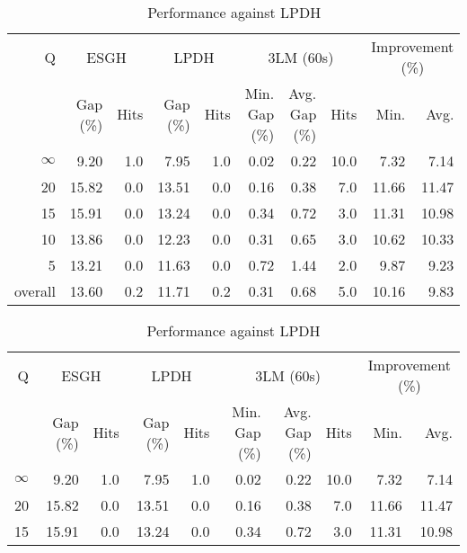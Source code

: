 \begin{table}[H]
\centering
\caption{Performance against LPDH}
\label{tab:3lm_resuts_kritikos2}
\begin{tabular}{r rr rr rrr rr}
\toprule
       Q & \multicolumn{2}{c}{ESGH} & \multicolumn{2}{c}{LPDH} & \multicolumn{3}{c}{3LM (60s)} & \multicolumn{2}{c}{Improvement (\%)} \\
         & Gap (\%) & Hits & Gap (\%) & Hits & Min. Gap (\%) & Avg. Gap (\%) & Hits &             Min. &  Avg. \\
\midrule
$\infty$ &     9.20 &  1.0 &     7.95 &  1.0 &          0.02 &          0.22 & 10.0 &             7.32 &  7.14 \\
      20 &    15.82 &  0.0 &    13.51 &  0.0 &          0.16 &          0.38 &  7.0 &            11.66 & 11.47 \\
      15 &    15.91 &  0.0 &    13.24 &  0.0 &          0.34 &          0.72 &  3.0 &            11.31 & 10.98 \\
      10 &    13.86 &  0.0 &    12.23 &  0.0 &          0.31 &          0.65 &  3.0 &            10.62 & 10.33 \\
       5 &    13.21 &  0.0 &    11.63 &  0.0 &          0.72 &          1.44 &  2.0 &             9.87 &  9.23 \\
\midrule
 overall &    13.60 &  0.2 &    11.71 &  0.2 &          0.31 &          0.68 &  5.0 &            10.16 &  9.83 \\
\bottomrule
\end{tabular}
\end{table}\begin{table}[H]
\centering
\caption{Performance against LPDH}
\label{tab:3lm_resuts_kritikos2}
\begin{tabular}{r rr rr rrr rr}
\toprule
       Q & \multicolumn{2}{c}{ESGH} & \multicolumn{2}{c}{LPDH} & \multicolumn{3}{c}{3LM (60s)} & \multicolumn{2}{c}{Improvement (\%)} \\
         & Gap (\%) & Hits & Gap (\%) & Hits & Min. Gap (\%) & Avg. Gap (\%) & Hits &             Min. &  Avg. \\
\midrule
$\infty$ &     9.20 &  1.0 &     7.95 &  1.0 &          0.02 &          0.22 & 10.0 &             7.32 &  7.14 \\
      20 &    15.82 &  0.0 &    13.51 &  0.0 &          0.16 &          0.38 &  7.0 &            11.66 & 11.47 \\
      15 &    15.91 &  0.0 &    13.24 &  0.0 &          0.34 &          0.72 &  3.0 &            11.31 & 10.98 \\

\end{tabular}
\end{table}
